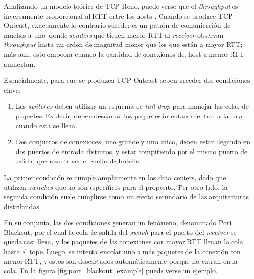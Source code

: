 \documentclass[runningheads,a4paper]{llncs}
\begin{document}
Analizando un modelo teórico de TCP Reno, puede verse que el \textit{throughput} es inversamente proporcional al RTT entre los hosts \cite{Padhye_TCP_Throughput_1998}. Cuando se produce TCP Outcast, exactamente lo contrario sucede: es un patrón de comunicación de muchos a uno, donde \textit{senders} que tienen menor RTT al \textit{receiver} observan \textit{throughput} hasta un orden de magnitud menor que los que están a mayor RTT; más aun, esto empeora cuando la cantidad de conexiones del host a menor RTT aumentan.

Esencialmente, para que se produzca TCP Outcast deben suceder dos condiciones clave:

\begin{enumerate}
    \item Los \textit{switches} deben utilizar un esquema de \textit{tail drop} para manejar las colas de paquetes. Es decir, deben descartar los paquetes intentando entrar a la cola cuando esta se llena.
    
    \item Dos conjuntos de conexiones, uno grande y uno chico, deben estar llegando en dos puertos de entrada distintos, y estar compitiendo por el mismo puerto de salida, que resulta ser el cuello de botella.
\end{enumerate}

La primer condición se cumple ampliamente en los data centers, dado que utilizan \textit{switches} que no son específicos para el propósito. Por otro lado, la segunda condición suele cumplirse como un efecto secundario de las arquitecturas distribuidas.

En su conjunto, las dos condiciones generan un fenómeno, denominado Port Blackout, por el cual la cola de salida del \textit{switch} para el puerto del \textit{receiver} se queda casi llena, y los paquetes de las conexiones con mayor RTT llenan la cola hasta el tope. Luego, se intenta encolar uno o más paquetes de la conexión con menor RTT, y estos son descartados automáticamente porque no entran en la cola. En la figura \ref{fig:port_blackout_example} puede verse un ejemplo.
\end{document}
